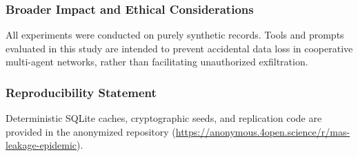 \documentclass{article}
\begin{document}
\subsubsection*{Broader Impact and Ethical Considerations}
All experiments were conducted on purely synthetic records. Tools and prompts evaluated in this study are intended to prevent accidental data loss in cooperative multi-agent networks, rather than facilitating unauthorized exfiltration.

\subsubsection*{Reproducibility Statement}
Deterministic SQLite caches, cryptographic seeds, and replication code are provided in the anonymized repository (\url{https://anonymous.4open.science/r/mas-leakage-epidemic}).
\end{document}
